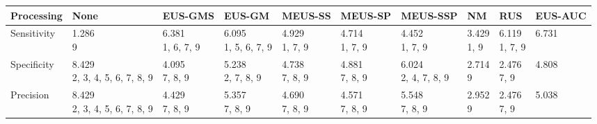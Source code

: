 \begin{tabular}{llllllllll}
\toprule
Processing &                                                     None &                                      EUS-GMS &                                          EUS-GM &                                   MEUS-SS &                                   MEUS-SP &                                        MEUS-SSP &                                     NM &                                       RUS &                            EUS-AUC \\
\midrule
Sensitivity       &                       \makecell{1.286 \\ \scriptsize{9}} &  \makecell{6.381 \\ \scriptsize{1, 6, 7, 9}} &  \makecell{6.095 \\ \scriptsize{1, 5, 6, 7, 9}} &  \makecell{4.929 \\ \scriptsize{1, 7, 9}} &  \makecell{4.714 \\ \scriptsize{1, 7, 9}} &        \makecell{4.452 \\ \scriptsize{1, 7, 9}} &  \makecell{3.429 \\ \scriptsize{1, 9}} &  \makecell{6.119 \\ \scriptsize{1, 7, 9}} &  \makecell{6.731 \\ \scriptsize{}} \\
Specificity       &  \makecell{8.429 \\ \scriptsize{2, 3, 4, 5, 6, 7, 8, 9}} &     \makecell{4.095 \\ \scriptsize{7, 8, 9}} &     \makecell{5.238 \\ \scriptsize{2, 7, 8, 9}} &  \makecell{4.738 \\ \scriptsize{7, 8, 9}} &  \makecell{4.881 \\ \scriptsize{7, 8, 9}} &  \makecell{6.024 \\ \scriptsize{2, 4, 7, 8, 9}} &     \makecell{2.714 \\ \scriptsize{9}} &     \makecell{2.476 \\ \scriptsize{7, 9}} &  \makecell{4.808 \\ \scriptsize{}} \\
Precision         &  \makecell{8.429 \\ \scriptsize{2, 3, 4, 5, 6, 7, 8, 9}} &     \makecell{4.429 \\ \scriptsize{7, 8, 9}} &        \makecell{5.357 \\ \scriptsize{7, 8, 9}} &  \makecell{4.690 \\ \scriptsize{7, 8, 9}} &  \makecell{4.571 \\ \scriptsize{7, 8, 9}} &        \makecell{5.548 \\ \scriptsize{7, 8, 9}} &     \makecell{2.952 \\ \scriptsize{9}} &     \makecell{2.476 \\ \scriptsize{7, 9}} &  \makecell{5.038 \\ \scriptsize{}} \\

\end{tabular}
